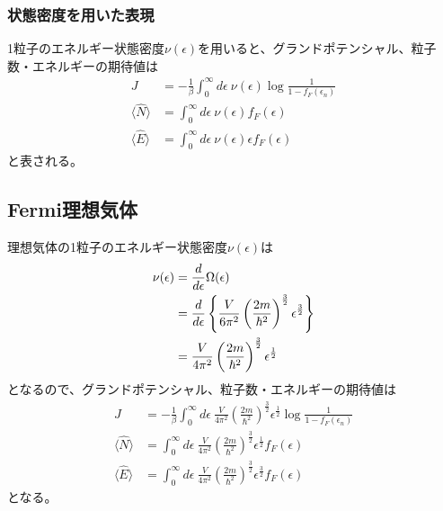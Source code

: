 \documentclass[dvipdfmx, 11pt, a4paper]{jsarticle}
\theoremstyle{definition}
\begin{document}
\subsubsection{状態密度を用いた表現}
    1粒子のエネルギー状態密度$\nu (\epsilon)$を用いると、グランドポテンシャル、粒子数・エネルギーの期待値は
    \begin{align}
        J &= -\frac{1}{\beta} \int_{0}^{\infty} d\epsilon\ \nu (\epsilon) \log \frac{1}{1 - f_F (\epsilon_n)} \\
        \langle \hat{N} \rangle &= \int_0^{\infty} d\epsilon\ \nu (\epsilon) f_F(\epsilon) \\
        \langle \hat{E} \rangle &= \int_0^{\infty} d\epsilon\  \nu (\epsilon) \epsilon f_F(\epsilon)
    \end{align}
    と表される。
\subsection{Fermi理想気体}
    理想気体の1粒子のエネルギー状態密度$\nu (\epsilon)$は
    \begin{align}
        \nu (\epsilon) &= \frac{d}{d\epsilon} \Omega (\epsilon) \notag \\
        &= \frac{d}{d\epsilon} \left\{ \frac{V}{6 \pi^2} \left( \frac{2m}{\hbar^2} \right)^{\frac{3}{2}} \epsilon^\frac{3}{2} \right\} \notag \\
        &= \frac{V}{4 \pi^2} \left( \frac{2m}{\hbar^2} \right)^{\frac{3}{2}} \epsilon^\frac{1}{2} 
    \end{align}
    となるので、グランドポテンシャル、粒子数・エネルギーの期待値は
    \begin{align}
        J &= -\frac{1}{\beta} \int_{0}^{\infty} d\epsilon\ \frac{V}{4 \pi^2} \left( \frac{2m}{\hbar^2} \right)^{\frac{3}{2}} \epsilon^\frac{1}{2} \log \frac{1}{1 - f_F (\epsilon_n)} \\
        \langle \hat{N} \rangle &= \int_0^{\infty} d\epsilon\ \frac{V}{4 \pi^2} \left( \frac{2m}{\hbar^2} \right)^{\frac{3}{2}} \epsilon^\frac{1}{2} f_F(\epsilon) \\
        \langle \hat{E} \rangle &= \int_0^{\infty} d\epsilon\  \frac{V}{4 \pi^2} \left( \frac{2m}{\hbar^2} \right)^{\frac{3}{2}} \epsilon^\frac{3}{2} f_F(\epsilon)
    \end{align}
    となる。
\end{document}
